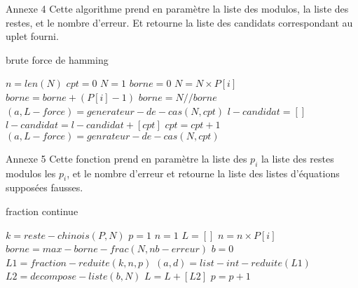 \documentclass[a4paper, 11pt]{report}
\begin{document}
\begin{appendices}
    Annexe 4 \newline
    Cette algorithme prend en paramètre la liste des modulos, la liste des restes, et le nombre d'erreur. Et retourne la liste des candidats correspondant au uplet fourni.
    \begin{algorithm}
        \caption{brute force de hamming}
        \begin{algorithmic}
            \STATE $n=len(N)$
            \STATE $cpt=0 $
            \STATE $N=1$
            \STATE $borne=0$
            \STATE $N=N\times P[i]$
            \STATE $borne=borne+ (P[i]-1)$
            \ENDFOR
            \STATE $borne=N//borne$
            \STATE $(a,L-force)= generateur-de-cas(N,cpt) $
            \STATE $l-candidat=[]$
            \STATE $l-candidat = l-candidat+[cpt]$
            \ENDIF
            \STATE $cpt=cpt+1$
            \STATE $(a,L-force)=genrateur-de-cas(N,cpt)$
            \ENDWHILE
        \end{algorithmic}
    \end{algorithm}
\end{appendices}

\newpage

\begin{appendices}
    Annexe 5
    Cette fonction prend en paramètre la liste des $p_i$ la liste des restes modulos les $p_i$, et le nombre d'erreur et retourne la liste des listes d'équations supposées fausses.
    \begin{algorithm}
        \caption{fraction continue}
        \begin{algorithmic}
            \STATE $k=reste-chinois(P,N)$
            \STATE $p=1$
            \STATE $n=1$
            \STATE $L=[]$
            \STATE $n=n\times P[i]$
            \ENDFOR
            \STATE $borne=max-borne-frac(N,nb-erreur)$
            \STATE $b=0$
            \STATE $L1= fraction-reduite(k,n,p)$
            \STATE $(a,d)=list-int-reduite(L1)$
            \STATE $L2=decompose-liste(b,N)$
            \STATE $L=L+[L2]$
            \ENDIF
            \STATE $p=p+1$
            \ENDWHILE
        \end{algorithmic}
    \end{algorithm}
\end{appendices}
\end{document}
